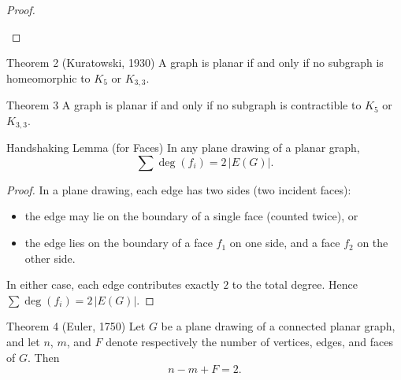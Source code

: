 \documentclass[11pt]{scrartcl}
\theoremstyle{plain}
\theoremstyle{remark}
\begin{document}
\begin{proof}
\begin{center}
\end{center}
\end{proof}

\begin{thmbox}{{Theorem 2 (Kuratowski, 1930)}}
A graph is planar if and only if no subgraph is homeomorphic to $K_5$ or $K_{3,3}$.
\end{thmbox}

\begin{thmbox}{Theorem 3}
A graph is planar if and only if no subgraph is contractible to $K_5$ or $K_{3,3}$.
\end{thmbox}

\begin{thmbox}{Handshaking Lemma (for Faces)}
In any plane drawing of a planar graph,
$$\sum \deg(f_i) = 2\,|E(G)|.$$
\end{thmbox}

\begin{proof}
In a plane drawing, each edge has two sides (two incident faces):
\begin{itemize}
  \item the edge may lie on the boundary of a single face (counted twice), or
  \item the edge lies on the boundary of a face $f_1$ on one side, and a face $f_2$ on the other side.
\end{itemize}
In either case, each edge contributes exactly $2$ to the total degree. Hence $\sum \deg(f_i) = 2\,|E(G)|$.
\end{proof}

\begin{thmbox}{{Theorem 4 (Euler, 1750)}}
Let $G$ be a plane drawing of a connected planar graph, and let $n$, $m$, and $F$ denote respectively the number of vertices, edges, and faces of $G$. Then
$$n - m + F = 2.$$
\end{thmbox}
\end{document}
